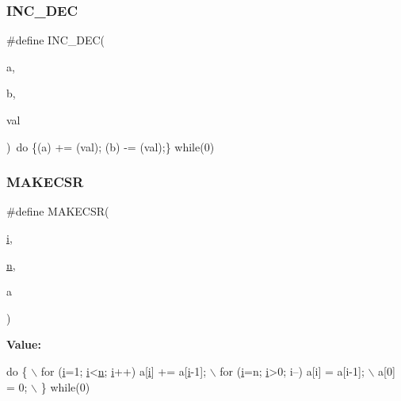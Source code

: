 \mbox{\label{a00053_a204beac01a28654b3ddd7eea0d6597fa}} 
\subsubsection{\texorpdfstring{I\+N\+C\+\_\+\+D\+EC}{INC\_DEC}}
{\footnotesize\ttfamily \#define I\+N\+C\+\_\+\+D\+EC(\begin{DoxyParamCaption}\item[{}]{a,  }\item[{}]{b,  }\item[{}]{val }\end{DoxyParamCaption})~do \{(a) += (val); (b) -\/= (val);\} while(0)}

\mbox{\label{a00053_a475f3191b01ce1b1cbce5d4fba41f3e7}} 
\subsubsection{\texorpdfstring{M\+A\+K\+E\+C\+SR}{MAKECSR}}
{\footnotesize\ttfamily \#define M\+A\+K\+E\+C\+SR(\begin{DoxyParamCaption}\item[{}]{\hyperlink{a00608_afb6aca53df96564f2adf086c942453ec}{i},  }\item[{}]{\hyperlink{a00623_a781a04ab095280f838ff3eb0e51312e0}{n},  }\item[{}]{a }\end{DoxyParamCaption})}

{\bfseries Value\+:}
\begin{DoxyCode}
\textcolor{keywordflow}{do} \{ \(\backslash\)
     for (\hyperlink{a01014_afb6aca53df96564f2adf086c942453ec}{i}=1; \hyperlink{a01014_afb6aca53df96564f2adf086c942453ec}{i}<\hyperlink{a00563_a4c2d80ab32fc3a598413ae25e9f2bdce}{n}; \hyperlink{a01014_afb6aca53df96564f2adf086c942453ec}{i}++) a[\hyperlink{a01014_afb6aca53df96564f2adf086c942453ec}{i}] += a[\hyperlink{a01014_afb6aca53df96564f2adf086c942453ec}{i}-1]; \(\backslash\)
     for (\hyperlink{a01014_afb6aca53df96564f2adf086c942453ec}{i}=n; \hyperlink{a01014_afb6aca53df96564f2adf086c942453ec}{i}>0; i--) a[i] = a[i-1]; \(\backslash\)
     a[0] = 0; \(\backslash\)
   \} \textcolor{keywordflow}{while}(0)
\end{DoxyCode}
\mbox{\label{a00053_a095506946a5862a37905e2014ea97f4e}} 
